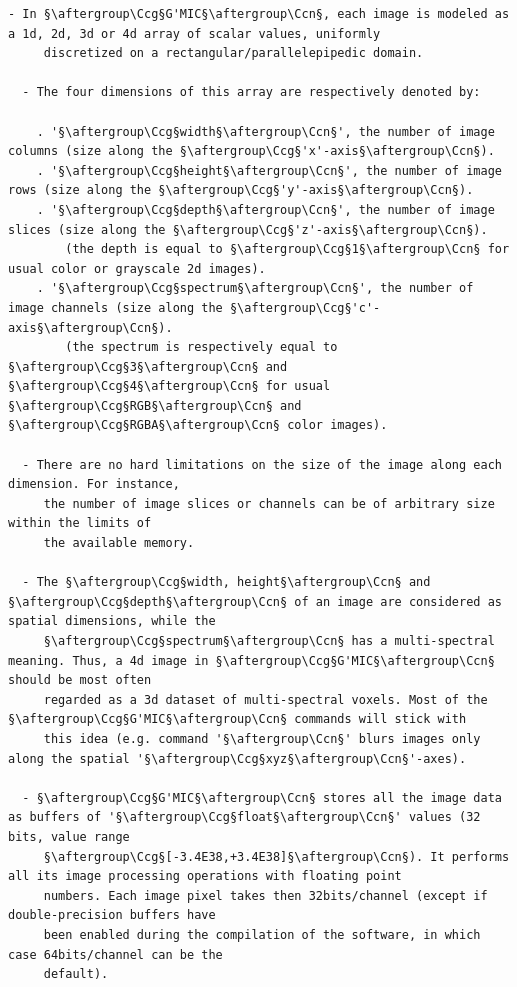 \documentclass[a4paper,10.5pt,twoside]{book}
\def\Ccg{\color{cc}}
\def\Ccn{\color{black}}
\begin{document}
\begin{lstlisting}[escapechar=§]
  - In §\aftergroup\Ccg§G'MIC§\aftergroup\Ccn§, each image is modeled as a 1d, 2d, 3d or 4d array of scalar values, uniformly 
     discretized on a rectangular/parallelepipedic domain. 
 
  - The four dimensions of this array are respectively denoted by: 
 
    . '§\aftergroup\Ccg§width§\aftergroup\Ccn§', the number of image columns (size along the §\aftergroup\Ccg§'x'-axis§\aftergroup\Ccn§). 
    . '§\aftergroup\Ccg§height§\aftergroup\Ccn§', the number of image rows (size along the §\aftergroup\Ccg§'y'-axis§\aftergroup\Ccn§). 
    . '§\aftergroup\Ccg§depth§\aftergroup\Ccn§', the number of image slices (size along the §\aftergroup\Ccg§'z'-axis§\aftergroup\Ccn§). 
        (the depth is equal to §\aftergroup\Ccg§1§\aftergroup\Ccn§ for usual color or grayscale 2d images). 
    . '§\aftergroup\Ccg§spectrum§\aftergroup\Ccn§', the number of image channels (size along the §\aftergroup\Ccg§'c'-axis§\aftergroup\Ccn§). 
        (the spectrum is respectively equal to §\aftergroup\Ccg§3§\aftergroup\Ccn§ and §\aftergroup\Ccg§4§\aftergroup\Ccn§ for usual §\aftergroup\Ccg§RGB§\aftergroup\Ccn§ and §\aftergroup\Ccg§RGBA§\aftergroup\Ccn§ color images). 
 
  - There are no hard limitations on the size of the image along each dimension. For instance, 
     the number of image slices or channels can be of arbitrary size within the limits of 
     the available memory. 
 
  - The §\aftergroup\Ccg§width, height§\aftergroup\Ccn§ and §\aftergroup\Ccg§depth§\aftergroup\Ccn§ of an image are considered as spatial dimensions, while the 
     §\aftergroup\Ccg§spectrum§\aftergroup\Ccn§ has a multi-spectral meaning. Thus, a 4d image in §\aftergroup\Ccg§G'MIC§\aftergroup\Ccn§ should be most often 
     regarded as a 3d dataset of multi-spectral voxels. Most of the §\aftergroup\Ccg§G'MIC§\aftergroup\Ccn§ commands will stick with 
     this idea (e.g. command '§\aftergroup\Ccn§' blurs images only along the spatial '§\aftergroup\Ccg§xyz§\aftergroup\Ccn§'-axes). 
 
  - §\aftergroup\Ccg§G'MIC§\aftergroup\Ccn§ stores all the image data as buffers of '§\aftergroup\Ccg§float§\aftergroup\Ccn§' values (32 bits, value range 
     §\aftergroup\Ccg§[-3.4E38,+3.4E38]§\aftergroup\Ccn§). It performs all its image processing operations with floating point 
     numbers. Each image pixel takes then 32bits/channel (except if double-precision buffers have 
     been enabled during the compilation of the software, in which case 64bits/channel can be the 
     default). 
 

\end{lstlisting}
\end{document}
